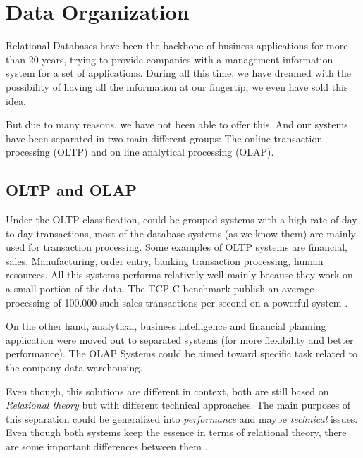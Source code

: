 \documentclass[10pt]{article} %
\begin{document}


\section{Data Organization}

Relational Databases have been the backbone of business applications for more  than 20 years, trying to provide companies with a management information system for a set of applications. During all this time, we have dreamed with the possibility of having all the information at our fingertip, we even have sold this idea\cite{Plattner}.

    But due to many reasons, we have not been able to offer this. And our systems have been separated in two main different groups: The online transaction processing (OLTP) and on line analytical processing (OLAP).

\subsection{OLTP and OLAP}
    Under the OLTP classification, could be grouped systems with a high rate of day to day transactions, most of the database systems (as we know them) are mainly used for transaction processing. Some examples of OLTP systems are financial, sales, Manufacturing, order entry, banking transaction processing, human resources. All this systems performs relatively well mainly because they work on a small portion of the data. The TCP-C benchmark publish an average processing of 100.000 such sales transactions per second on a powerful system \cite{Kemper}.
    
    On the other hand, analytical, business intelligence and financial planning application were moved out to separated systems (for more flexibility and better performance). The OLAP Systems could be aimed toward specific task related to the company data warehousing. 
    
    Even though, this solutions are different in context, both are still based on \emph{ Relational theory } but with different technical approaches. The main purposes of this separation could be generalized into \emph{ performance } and maybe \emph{technical} issues. Even though both systems keep the essence in terms of relational theory, there are some important differences between them \cite{Plattner}.
\end{document}
